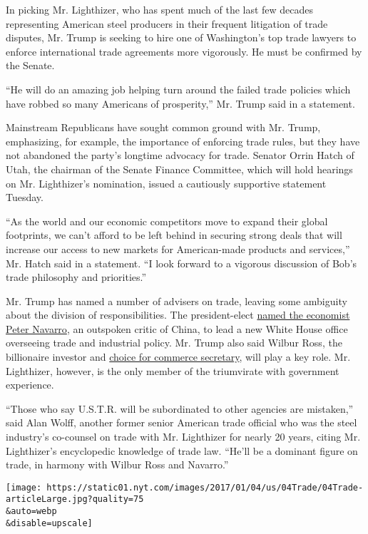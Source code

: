 In picking Mr. Lighthizer, who has spent much of the last few decades
representing American steel producers in their frequent litigation of
trade disputes, Mr. Trump is seeking to hire one of Washington's top
trade lawyers to enforce international trade agreements more vigorously.
He must be confirmed by the Senate.

``He will do an amazing job helping turn around the failed trade
policies which have robbed so many Americans of prosperity,'' Mr. Trump
said in a statement.

Mainstream Republicans have sought common ground with Mr. Trump,
emphasizing, for example, the importance of enforcing trade rules, but
they have not abandoned the party's longtime advocacy for trade. Senator
Orrin Hatch of Utah, the chairman of the Senate Finance Committee, which
will hold hearings on Mr. Lighthizer's nomination, issued a cautiously
supportive statement Tuesday.

``As the world and our economic competitors move to expand their global
footprints, we can't afford to be left behind in securing strong deals
that will increase our access to new markets for American-made products
and services,'' Mr. Hatch said in a statement. ``I look forward to a
vigorous discussion of Bob's trade philosophy and priorities.''

Mr. Trump has named a number of advisers on trade, leaving some
ambiguity about the division of responsibilities. The president-elect
\href{https://www.nytimes.com/2016/12/21/us/politics/peter-navarro-carl-icahn-trump-china-trade.html?_r=0}{named
the economist Peter Navarro}, an outspoken critic of China, to lead a
new White House office overseeing trade and industrial policy. Mr. Trump
also said Wilbur Ross, the billionaire investor and
\href{https://www.nytimes.com/2016/11/25/business/dealbook/wilbur-ross-commerce-secretary-donald-trump.html}{choice
for commerce secretary}, will play a key role. Mr. Lighthizer, however,
is the only member of the triumvirate with government experience.

``Those who say U.S.T.R. will be subordinated to other agencies are
mistaken,'' said Alan Wolff, another former senior American trade
official who was the steel industry's co-counsel on trade with Mr.
Lighthizer for nearly 20 years, citing Mr. Lighthizer's encyclopedic
knowledge of trade law. ``He'll be a dominant figure on trade, in
harmony with Wilbur Ross and Navarro.''

\texttt{[image: https://static01.nyt.com/images/2017/01/04/us/04Trade/04Trade-articleLarge.jpg?quality=75\\\&auto=webp\\\&disable=upscale]}

